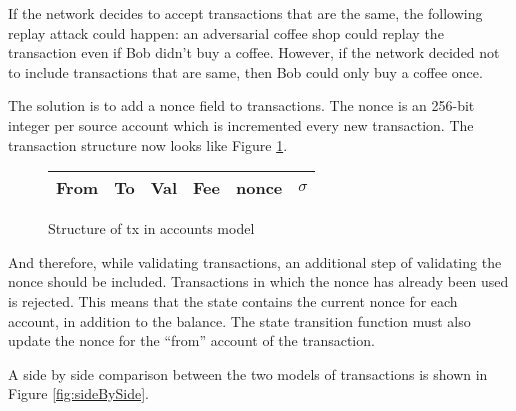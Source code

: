 If the network decides to accept transactions that are the same, the following replay attack could happen: an adversarial coffee shop could replay the transaction even if Bob didn't buy a coffee. However, if the network decided not to include transactions that are same, then Bob could only buy a coffee once.

The solution is to add a nonce field to transactions. The nonce is an 256-bit integer per source account which is incremented every new transaction. The transaction structure now looks like Figure \ref{fig:accountsTxWithNonce}.

\begin{figure}[ht]
\centering
    \begin{tabular}{|c|c|c|c|c|c|}
         \hline
         From & To & Val & Fee & \textbf{nonce} & {$\sigma$} \\
         \hline
    \end{tabular}
    \caption{Structure of tx in accounts model}
    \label{fig:accountsTxWithNonce}
\end{figure}

And therefore, while validating transactions, an additional step of validating the nonce should be included. Transactions in which the nonce
has already been used is rejected.
This means that the state contains the current nonce for each account, in addition to the balance.
The state transition function must also update the nonce for the ``from'' account of the transaction.

A side by side comparison between the two models  of transactions is shown in Figure \ref{fig:sideBySide}.

